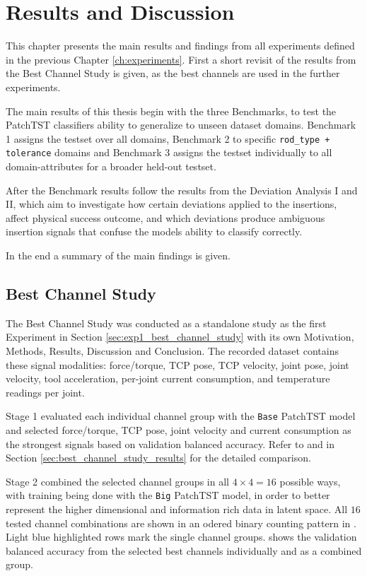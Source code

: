 \chapter{Results and Discussion}
\label{chap:results}
This chapter presents the main results and findings from all experiments defined in the previous Chapter \ref{ch:experiments}. First a short revisit of the results from the Best Channel Study is given, as the best channels are used in the further experiments.

The main results of this thesis begin with the three Benchmarks, to test the PatchTST classifiers ability to generalize to unseen dataset domains. Benchmark 1 assigns the testset over all domains, Benchmark 2 to specific \texttt{rod\_type + tolerance} domains and Benchmark 3 assigns the testset individually to all domain-attributes for a broader held-out testset.

After the Benchmark results follow the results from the Deviation Analysis I and II, which aim to investigate how certain deviations applied to the insertions, affect physical success outcome, and which deviations produce ambiguous insertion signals that confuse the models ability to classify correctly.

In the end a summary of the main findings is given.


\section{Best Channel Study}
\label{sec:results_best_channel}
The Best Channel Study was conducted as a standalone study as the first Experiment in Section \ref{sec:exp1_best_channel_study} with its own Motivation, Methods, Results, Discussion and Conclusion.
The recorded dataset contains these signal modalities: force/torque, TCP pose, TCP velocity, joint pose, joint velocity, tool acceleration, per-joint current consumption, and temperature readings per joint.

Stage 1 evaluated each individual channel group with the \texttt{Base} PatchTST model and selected force/torque, TCP pose, joint velocity and current consumption as the strongest signals based on validation balanced accuracy. Refer to  and  in Section \ref{sec:best_channel_study_results} for the detailed comparison.

Stage 2 combined the selected channel groups in all $4\times4=16$ possible ways, with training being done with the \texttt{Big} PatchTST model, in order to better represent the higher dimensional and information rich data in latent space. All $16$ tested channel combinations are shown in an odered binary counting pattern in . Light blue highlighted rows mark the single channel groups.  shows the validation balanced accuracy from the selected best channels individually and as a combined group.


